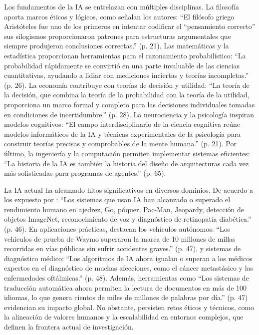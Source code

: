Los fundamentos de la IA se entrelazan con múltiples disciplinas. La filosofía aporta marcos éticos y lógicos, como señalan los autores: ``El filósofo griego Aristóteles fue uno de los primeros en intentar codificar el ``pensamiento correcto'' sus silogismos proporcionaron patrones para estructuras argumentales que siempre produjeron conclusiones correctas.'' (p. 21). Las matemáticas y la estadística proporcionan herramientas para el razonamiento probabilístico: ``La probabilidad rápidamente se convirtió en una parte invaluable de las ciencias cuantitativas, ayudando a lidiar con mediciones inciertas y teorías incompletas.'' (p. 26). La economía contribuye con teorías de decisión y utilidad: ``La teoría de la decisión, que combina la teoría de la probabilidad con la teoría de la utilidad, proporciona un marco formal y completo para las decisiones individuales tomadas en condiciones de incertidumbre.'' (p. 28). La neurociencia y la psicología inspiran modelos cognitivos: ``El campo interdisciplinario de la ciencia cognitiva reúne modelos informáticos de la IA y técnicas experimentales de la psicología para construir teorías precisas y comprobables de la mente humana.'' (p. 21). Por último, la ingeniería y la computación permiten implementar sistemas eficientes: ``La historia de la IA es también la historia del diseño de arquitecturas cada vez más sofisticadas para programas de agentes.'' (p. 65).

La IA actual ha alcanzado hitos significativos en diversos dominios. De acuerdo a los expuesto por  \citeauthor{russell_artificial_2022} \citeyear{russell_artificial_2022}: “Los sistemas que usan IA han alcanzado o superado el rendimiento humano en ajedrez, Go, póquer, Pac-Man, Jeopardy, detección de objetos ImageNet, reconocimiento de voz y diagnóstico de retinopatía diabética.'' (p. 46). En aplicaciones prácticas, destacan los vehículos autónomos: ``Los vehículos de prueba de Waymo superaron la marca de 10 millones de millas recorridas en vías públicas sin sufrir accidentes graves.'' (p. 47), y sistemas de diagnóstico médico: ``Los algoritmos de IA ahora igualan o superan a los médicos expertos en el diagnóstico de muchas afecciones, como el cáncer metastásico y las enfermedades oftálmicas.'' (p. 48). Además, herramientas como ``Los sistemas de traducción automática ahora permiten la lectura de documentos en más de 100 idiomas, lo que genera cientos de miles de millones de palabras por día.'' (p. 47) evidencian su impacto global. No obstante, persisten retos éticos y técnicos, como la alineación de valores humanos y la escalabilidad en entornos complejos, que definen la frontera actual de investigación.


